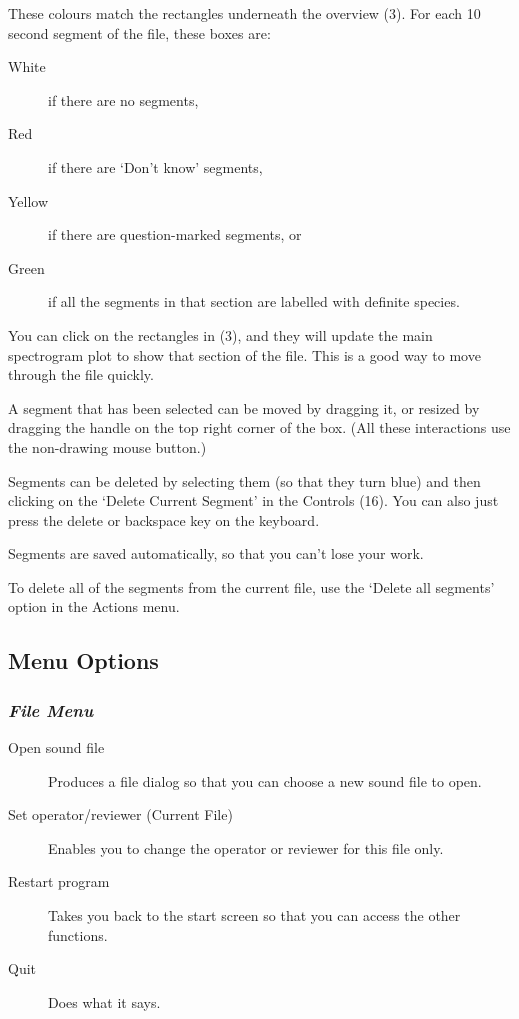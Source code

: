 \documentclass{article}
\begin{document}
These colours match the rectangles underneath the overview (3). For each 10 second segment of the file, these boxes are:
	\begin{description} 
 	\item[White] if there are no segments, 
	\item[Red] if there are `Don't know' segments, 
	\item[Yellow] if there are question-marked segments, or 
	\item[Green] if all the segments in that section are labelled with definite species. 
	\end{description}
	
You can click on the rectangles in (3), and they will update the main spectrogram plot to show that section of the file. This is a good way to move through the file quickly.

A segment that has been selected can be moved by dragging it, or resized by dragging the handle on the top right corner of the box. (All these interactions use the non-drawing mouse button.)

Segments can be deleted by selecting them (so that they turn blue) and then clicking on the `Delete Current Segment' in the Controls (16). You can also just press the delete or backspace key on the keyboard. 

Segments are saved automatically, so that you can't lose your work.

To delete all of the segments from the current file, use the `Delete all segments' option in the Actions menu. 

\subsection{Menu Options}	
\subsubsection{{\em File Menu}}

\begin{description}
\item[Open sound file] Produces a file dialog so that you can choose a new sound file to open.
\item[Set operator/reviewer (Current File)] Enables you to change the operator or reviewer for this file only. 
\item[Restart program] Takes you back to the start screen so that you can access the other functions.
\item[Quit] Does what it says.
\end{description}
\end{document}
